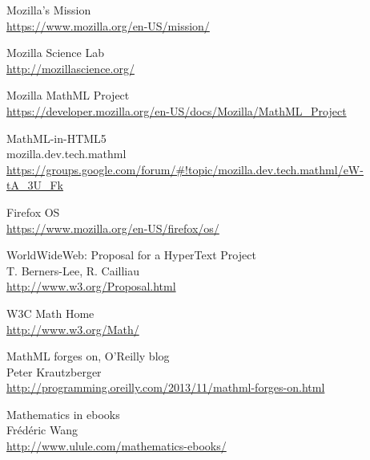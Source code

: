 \begin{thebibliography}{7}

Mozilla's Mission \\
\href{https://www.mozilla.org/en-US/mission/}{https://www.mozilla.org/en-US/mission/}

Mozilla Science Lab \\
\href{http://mozillascience.org/}{http://mozillascience.org/}

Mozilla MathML Project \\
\href{https://developer.mozilla.org/en-US/docs/Mozilla/MathML_Project}{https://developer.mozilla.org/en-US/docs/Mozilla/MathML\_Project}

MathML-in-HTML5 \\
mozilla.dev.tech.mathml \\
\href{https://groups.google.com/forum/#!topic/mozilla.dev.tech.mathml/eW-tA_3U_Fk}{https://groups.google.com/forum/\#!topic/mozilla.dev.tech.mathml/eW-tA\_3U\_Fk}

Firefox OS \\
\href{https://www.mozilla.org/en-US/firefox/os/}{https://www.mozilla.org/en-US/firefox/os/}

WorldWideWeb: Proposal for a HyperText Project \\
T. Berners-Lee, R. Cailliau \\
\href{http://www.w3.org/Proposal.html}{http://www.w3.org/Proposal.html}

W3C Math Home \\
\href{http://www.w3.org/Math/}{http://www.w3.org/Math/}

MathML forges on, O'Reilly blog \\
Peter Krautzberger \\
\href{http://programming.oreilly.com/2013/11/mathml-forges-on.html}{http://programming.oreilly.com/2013/11/mathml-forges-on.html}

Mathematics in ebooks \\
Frédéric Wang \\
\href{http://www.ulule.com/mathematics-ebooks/}{http://www.ulule.com/mathematics-ebooks/}

\end{thebibliography}

